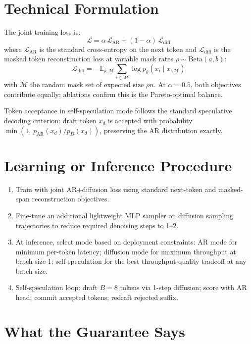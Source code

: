 \documentclass[10pt,twocolumn]{article}
\begin{document}
\section{Technical Formulation}

The joint training loss is:
\[
\mathcal{L} = \alpha\,\mathcal{L}_{\text{AR}} +
  (1-\alpha)\,\mathcal{L}_{\text{diff}}
\]
where $\mathcal{L}_{\text{AR}}$ is the standard cross-entropy on
the next token and $\mathcal{L}_{\text{diff}}$ is the masked token
reconstruction loss at variable mask rates
$\rho \sim \text{Beta}(a, b)$:
\[
\mathcal{L}_{\text{diff}} = -\mathbb{E}_{\rho, \mathcal{M}}
  \sum_{i \in \mathcal{M}} \log p_\theta(x_i \mid x_{\backslash\mathcal{M}})
\]
with $\mathcal{M}$ the random mask set of expected size $\rho n$.
At $\alpha = 0.5$, both objectives contribute equally; ablations
confirm this is the Pareto-optimal balance.

Token acceptance in self-speculation mode follows the standard
speculative decoding criterion: draft token $x_d$ is accepted with
probability $\min(1,\, p_{\text{AR}}(x_d) / p_D(x_d))$, preserving
the AR distribution exactly.

\section{Learning or Inference Procedure}

\begin{enumerate}[itemsep=2pt,parsep=0pt]
  \item Train with joint AR+diffusion loss using standard next-token
    and masked-span reconstruction objectives.
  \item Fine-tune an additional lightweight MLP sampler on diffusion
    sampling trajectories to reduce required denoising steps to 1--2.
  \item At inference, select mode based on deployment constraints:
    AR mode for minimum per-token latency; diffusion mode for maximum
    throughput at batch size 1; self-speculation for the best
    throughput-quality tradeoff at any batch size.
  \item Self-speculation loop: draft $B=8$ tokens via 1-step diffusion;
    score with AR head; commit accepted tokens; redraft rejected suffix.
\end{enumerate}

\section{What the Guarantee Says}
\end{document}
